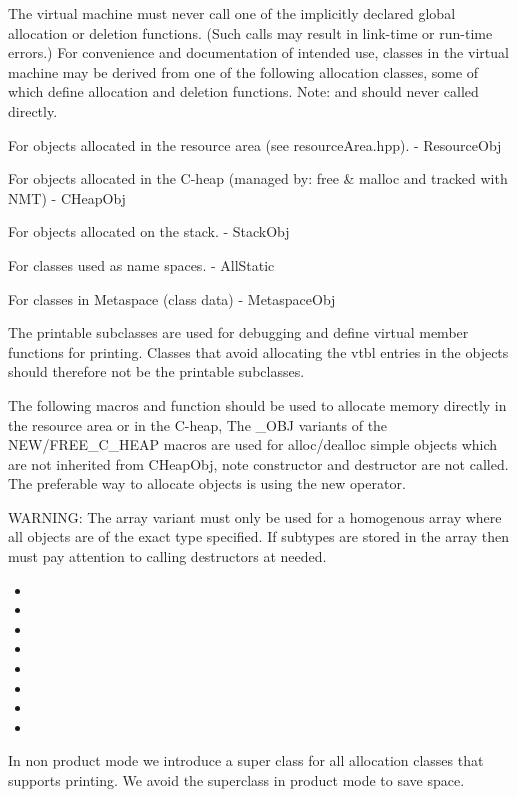 
\begin{flushleft}

The virtual machine must never call one of the implicitly declared
global allocation or deletion functions.  (Such calls may result in
link-time or run-time errors.)  For convenience and documentation of
intended use, classes in the virtual machine may be derived from one
of the following allocation classes, some of which define allocation
and deletion functions.
Note:  and  should never called directly.


For objects allocated in the resource area (see resourceArea.hpp).
- ResourceObj

For objects allocated in the C-heap (managed by: free \& malloc and tracked with NMT)
- CHeapObj

For objects allocated on the stack.
- StackObj

For classes used as name spaces.
- AllStatic

For classes in Metaspace (class data)
- MetaspaceObj

The printable subclasses are used for debugging and define virtual
member functions for printing. Classes that avoid allocating the
vtbl entries in the objects should therefore not be the printable
subclasses.

The following macros and function should be used to allocate memory
directly in the resource area or in the C-heap, The \_OBJ variants
of the NEW/FREE\_C\_HEAP macros are used for alloc/dealloc simple
objects which are not inherited from CHeapObj, note constructor and
destructor are not called. The preferable way to allocate objects
is using the new operator.

WARNING: The array variant must only be used for a homogenous array
where all objects are of the exact type specified. If subtypes are
stored in the array then must pay attention to calling destructors
at needed.

\begin{itemize}
\item {}
\item {}
\item {}
\item {}
\item {}
\item {}
\item {}
\item {}
\end{itemize}

In non product mode we introduce a super class for all allocation classes
that supports printing.
We avoid the superclass in product mode to save space.

\end{flushleft}